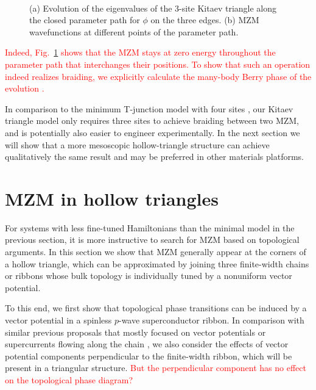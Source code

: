 \documentclass[aps,prb,showpacs,amsmath,twocolumn,amssymb,superscriptaddress]{revtex4-2}
\newcommand{\Red}[1]{\textcolor{red}{#1}}
\begin{document}
\begin{figure}[ht]
	\centering
	\\
	\caption{(a) Evolution of the eigenvalues of the 3-site Kitaev triangle along the closed parameter path for $\phi$ on the three edges. (b) MZM wavefunctions at different points of the parameter path.} 
	\label{fig:3eig}
\end{figure}

\Red{Indeed, Fig.~\ref{fig:3eig} shows that the MZM stays at zero energy throughout the parameter path that interchanges their positions. To show that such an operation indeed realizes braiding, we explicitly calculate the many-body Berry phase of the evolution \cite{aliceaNonAbelianStatisticsTopological2011,Li_2016}.}

In comparison to the minimum T-junction model with four sites \cite{aliceaNonAbelianStatisticsTopological2011}, our Kitaev triangle model only requires three sites to achieve braiding between two MZM, and is potentially also easier to engineer experimentally. In the next section we will show that a more mesoscopic hollow-triangle structure can achieve qualitatively the same result and may be preferred in other materials platforms.

\section{MZM in hollow triangles}
For systems with less fine-tuned Hamiltonians than the minimal model in the previous section, it is more instructive to search for MZM based on topological arguments. In this section we show that MZM generally appear at the corners of a hollow triangle, which can be approximated by joining three finite-width chains or ribbons whose bulk topology is individually tuned by a nonuniform vector potential. 

To this end, we first show that topological phase transitions can be induced by a vector potential in a spinless $p$-wave superconductor ribbon. In comparison with similar previous proposals that mostly focused on vector potentials or supercurrents flowing along the chain \cite{romitoManipulatingMajoranaFermions2012, takasanSupercurrentinducedTopologicalPhase2022}, we also consider the effects of vector potential components perpendicular to the finite-width ribbon, which will be present in a triangular structure. \Red{But the perpendicular component has no effect on the topological phase diagram?}
\end{document}

